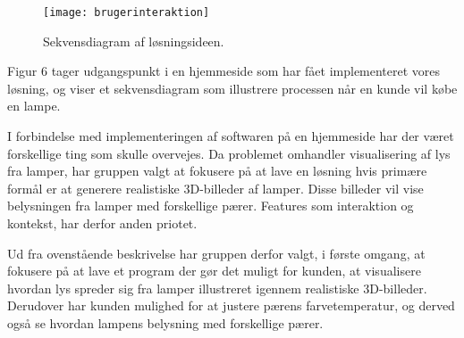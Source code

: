 \begin{figure}[H]
   \centering
   \texttt{[image: brugerinteraktion]}
   \caption{Sekvensdiagram af løsningsideen.}
\end{figure}

Figur 6 tager udgangspunkt i en hjemmeside som har fået implementeret vores løsning, og viser et sekvensdiagram som illustrere processen når en kunde vil købe en lampe.  

I forbindelse med implementeringen af softwaren på en hjemmeside har der været forskellige ting som skulle overvejes. Da problemet omhandler visualisering af lys fra lamper, har gruppen valgt at fokusere på at lave en løsning hvis primære formål er at generere realistiske 3D-billeder af lamper. Disse billeder vil vise belysningen fra lamper med forskellige pærer. Features som interaktion og kontekst, har derfor anden priotet. 

Ud fra ovenstående beskrivelse har gruppen derfor valgt, i første omgang, at fokusere på at lave et program der gør det muligt for kunden, at visualisere hvordan lys spreder sig fra lamper illustreret igennem realistiske 3D-billeder. Derudover har kunden mulighed for at justere pærens farvetemperatur, og derved også se hvordan lampens belysning med forskellige pærer.  


